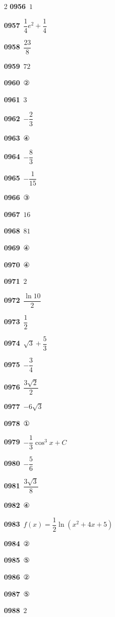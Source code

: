 \documentclass[10pt,a4paper]{article}
\begin{document}
\begin{multicols}{2}
\noindent\textbf{0956}\ $1$\par
\noindent\textbf{0957}\ $\dfrac{1}{4}e^2+\dfrac{1}{4}$\par
\noindent\textbf{0958}\ $\dfrac{23}{8}$\par
\noindent\textbf{0959}\ $72$\par
\noindent\textbf{0960}\ ②\par
\noindent\textbf{0961}\ $3$\par
\noindent\textbf{0962}\ $-\dfrac{2}{3}$\par
\noindent\textbf{0963}\ ④\par
\noindent\textbf{0964}\ $-\dfrac{8}{3}$\par
\noindent\textbf{0965}\ $-\dfrac{1}{15}$\par
\noindent\textbf{0966}\ ③\par
\noindent\textbf{0967}\ $16$\par
\noindent\textbf{0968}\ $81$\par
\noindent\textbf{0969}\ ④\par
\noindent\textbf{0970}\ ④\par
\noindent\textbf{0971}\ $2$\par
\noindent\textbf{0972}\ $\dfrac{\ln 10}{2}$\par
\noindent\textbf{0973}\ $\dfrac{1}{2}$\par
\noindent\textbf{0974}\ $\sqrt{3}+\dfrac{5}{3}$\par
\noindent\textbf{0975}\ $-\dfrac{3}{4}$\par
\noindent\textbf{0976}\ $\dfrac{3\sqrt{2}}{2}$\par
\noindent\textbf{0977}\ $-6\sqrt{3}$\par
\noindent\textbf{0978}\ ①\par
\noindent\textbf{0979}\ $-\dfrac{1}{3}\cos^3 x+C$\par
\noindent\textbf{0980}\ $-\dfrac{5}{6}$\par
\noindent\textbf{0981}\ $\dfrac{3\sqrt{3}}{8}$\par
\noindent\textbf{0982}\ ④\par
\noindent\textbf{0983}\ $f(x)=\dfrac{1}{2}\ln(x^2+4x+5)$\par
\noindent\textbf{0984}\ ②\par
\noindent\textbf{0985}\ ⑤\par
\noindent\textbf{0986}\ ②\par
\noindent\textbf{0987}\ ⑤\par
\noindent\textbf{0988}\ $2$\par

\end{multicols}
\end{document}
